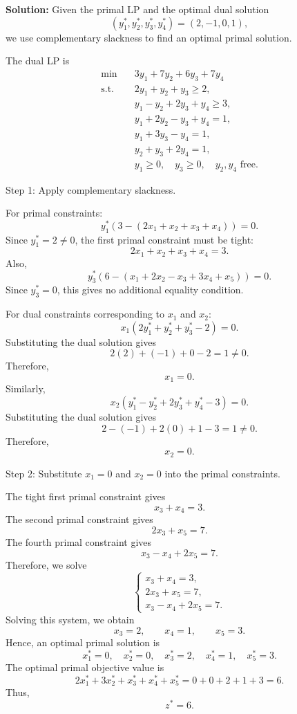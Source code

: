 \documentclass[11pt]{article}
\begin{document}
\begin{enumerate}
{\color{red}
\textbf{Solution:}
Given the primal LP and the optimal dual solution
\[
(y_1^*,y_2^*,y_3^*,y_4^*)=(2,-1,0,1),
\]
we use complementary slackness to find an optimal primal solution.

The dual LP is
\[
\begin{aligned}
\min \quad & 3y_1+7y_2+6y_3+7y_4\\
\text{s.t.}\quad
& 2y_1+y_2+y_3 \geq 2,\\
& y_1-y_2+2y_3+y_4 \geq 3,\\
& y_1+2y_2-y_3+y_4 = 1,\\
& y_1+3y_3-y_4 = 1,\\
& y_2+y_3+2y_4 = 1,\\
& y_1\geq 0,\quad y_3\geq 0,\quad y_2,y_4 \text{ free.}
\end{aligned}
\]

Step 1: Apply complementary slackness.

For primal constraints:
\[
y_1^*\left(3-(2x_1+x_2+x_3+x_4)\right)=0.
\]
Since $y_1^*=2\neq 0$, the first primal constraint must be tight:
\[
2x_1+x_2+x_3+x_4=3.
\]
Also,
\[
y_3^*\left(6-(x_1+2x_2-x_3+3x_4+x_5)\right)=0.
\]
Since $y_3^*=0$, this gives no additional equality condition.

For dual constraints corresponding to $x_1$ and $x_2$:
\[
x_1\left(2y_1^*+y_2^*+y_3^*-2\right)=0.
\]
Substituting the dual solution gives
\[
2(2)+(-1)+0-2=1\neq 0.
\]
Therefore,
\[
x_1=0.
\]
Similarly,
\[
x_2\left(y_1^*-y_2^*+2y_3^*+y_4^*-3\right)=0.
\]
Substituting the dual solution gives
\[
2-(-1)+2(0)+1-3=1\neq 0.
\]
Therefore,
\[
x_2=0.
\]

Step 2: Substitute $x_1=0$ and $x_2=0$ into the primal constraints.

The tight first primal constraint gives
\[
x_3+x_4=3.
\]
The second primal constraint gives
\[
2x_3+x_5=7.
\]
The fourth primal constraint gives
\[
x_3-x_4+2x_5=7.
\]
Therefore, we solve
\[
\begin{cases}
x_3+x_4=3,\\
2x_3+x_5=7,\\
x_3-x_4+2x_5=7.
\end{cases}
\]
Solving this system, we obtain
\[
x_3=2,\qquad x_4=1,\qquad x_5=3.
\]
Hence, an optimal primal solution is
\[
\boxed{
x_1^*=0,\quad
x_2^*=0,\quad
x_3^*=2,\quad
x_4^*=1,\quad
x_5^*=3.
}
\]
The optimal primal objective value is
\[
2x_1^*+3x_2^*+x_3^*+x_4^*+x_5^*
=
0+0+2+1+3
=
6.
\]
Thus,
\[
\boxed{z^*=6.}
\]
}

\vspace{1em}


\end{enumerate}
\end{document}

